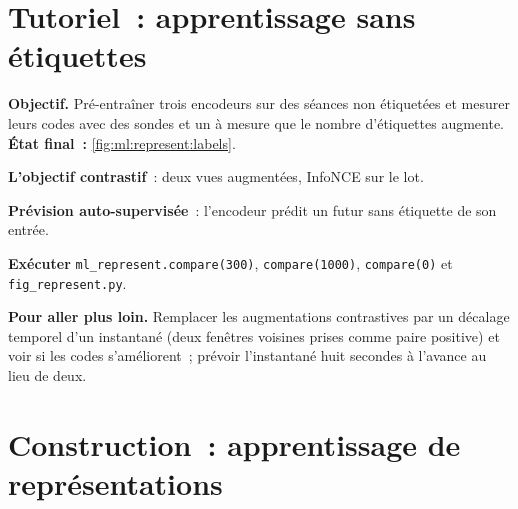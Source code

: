\section{Tutoriel~: apprentissage sans étiquettes}\label{tut:ml:representation-learning:tut}

\begin{tutorial}
\textbf{Objectif.} Pré-entraîner trois encodeurs sur des séances non étiquetées et mesurer leurs codes avec des sondes et un  à mesure que le
nombre d'étiquettes augmente. \textbf{État final~:} \cref{fig:ml:represent:labels}.
\begin{tutsteps}
\item \textbf{L'objectif contrastif}~: deux vues augmentées, InfoNCE sur le lot.
\label{lst:ml:represent:contrastive}
\item \textbf{Prévision auto-supervisée}~: l'encodeur prédit un futur sans étiquette de son entrée.
\label{lst:ml:represent:predictive}
\item \textbf{Exécuter} \texttt{ml\_represent.compare(300)}, \texttt{compare(1000)}, \texttt{compare(0)} et
\texttt{fig\_represent.py}.
\end{tutsteps}
\textbf{Pour aller plus loin.} Remplacer les augmentations contrastives par un décalage temporel d'un instantané (deux fenêtres voisines prises comme
paire positive) et voir si les codes s'améliorent~; prévoir l'instantané huit secondes à l'avance au lieu de deux.
\end{tutorial}

\section{Construction~: apprentissage de représentations}\label{bld:ml:representation-learning:represent}

